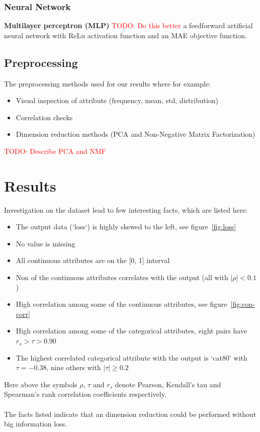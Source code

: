 \documentclass[a4paper]{article}
\newcommand\todo[1]{\textcolor{red}{TODO: #1}}
\begin{document}
\subsubsection{Neural Network}
\textbf{Multilayer perceptron (MLP)} \todo{Do this better} a feedforward artificial neural network with ReLu activation function and an MAE objective function.

\subsection{Preprocessing}
The preprocessing methods used for our results where for example:
\begin{itemize}
    \item Visual inspection of attribute (frequency, mean, std, distribution)
    \item Correlation checks
    \item Dimension reduction methods (PCA and Non-Negative Matrix Factorization)
\end{itemize}

\todo{Describe PCA and NMF}


%

\section{Results}
Investigation on the dataset lead to few interesting facts, which are listed here:
\begin{itemize}
    \item The output data (‘loss‘) is highly skewed to the left, see figure~\ref{fig:loss}
    \item No value is missing
    \item All continuous attributes are on the [0, 1] interval
    \item Non of the continuous attributes correlates with the output (all with $|\rho| < 0.1$)
    \item High correlation among some of the continuous attributes, see figure~\ref{fig:con-corr}
    \item High correlation among some of the categorical attributes, eight pairs have $r_s > \tau > 0.90$
    \item The highest correlated categorical attribute with the output is ‘cat80’ with $\tau=-0.38$, nine others with $|\tau| \geq 0.2$
\end{itemize}
Here above the symbols $\rho$, $\tau$ and $r_s$ denote Pearson, Kendall's tau and Spearman’s rank correlation coefficients respectively. \\\\
The facts listed indicate that an dimension reduction could be performed without big information loss.
\end{document}
